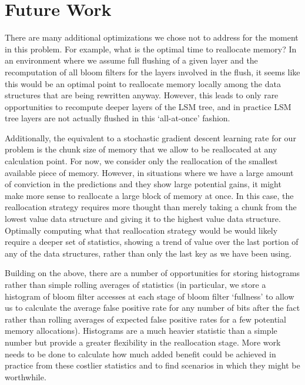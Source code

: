 \documentclass{sig-alternate-05-2015}
\begin{document}
\section{Future Work}
There are many additional optimizations we chose not to address for the moment in this problem. For example, what is the optimal time to reallocate memory? In an environment where we assume full flushing of a given layer and the recomputation of all bloom filters for the layers involved in the flush, it seems like this would be an optimal point to reallocate memory locally among the data structures that are being rewritten anyway. However, this leads to only rare opportunities to recompute deeper layers of the LSM tree, and in practice LSM tree layers are not actually flushed in this `all-at-once' fashion. 

Additionally, the equivalent to a stochastic gradient descent learning rate for our problem is the chunk size of memory that we allow to be reallocated at any calculation point. For now, we consider only the reallocation of the smallest available piece of memory. However, in situations where we have a large amount of conviction in the predictions and they show large potential gains, it might make more sense to reallocate a large block of memory at once. In this case, the reallocation strategy requires more thought than merely taking a chunk from the lowest value data structure and giving it to the highest value data structure. Optimally computing what that reallocation strategy would be would likely require a deeper set of statistics, showing a trend of value over the last portion of any of the data structures, rather than only the last key as we have been using.

Building on the above, there are a number of opportunities for storing histograms rather than simple rolling averages of statistics (in particular, we store a histogram of bloom filter accesses at each stage of bloom filter `fullness' to allow us to calculate the average false positive rate for any number of bits after the fact rather than rolling averages of expected false positive rates for a few potential memory allocations). Histograms are a much heavier statistic than a simple number but provide a greater flexibility in the reallocation stage. More work needs to be done to calculate how much added benefit could be achieved in practice from these costlier statistics and to find scenarios in which they might be worthwhile.

\end{document}
